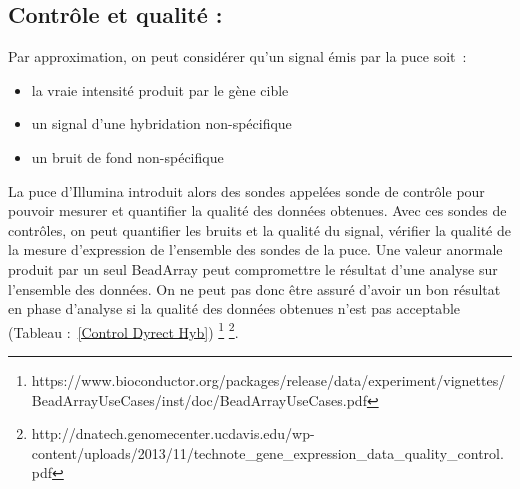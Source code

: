 \documentclass[a4paper,10pt]{article}
\begin{document}
\subsection{ Contrôle et qualité :}
Par approximation, on peut considérer qu’un signal émis par la puce soit :
\begin{itemize}
 \item la vraie intensité produit par le gène cible
 \item un signal d’une hybridation non-spécifique
 \item un bruit de fond non-spécifique
\end{itemize}
La puce d’Illumina introduit alors des sondes appelées sonde de contrôle pour pouvoir mesurer et quantifier la qualité des données obtenues.
Avec ces sondes de contrôles, on peut quantifier les bruits et la qualité du signal, vérifier la qualité de la mesure d’expression de l'ensemble des sondes de la puce. 
Une valeur anormale produit par un seul BeadArray peut compromettre le résultat d’une analyse sur l’ensemble des données. 
On ne peut pas donc être assuré d’avoir un bon résultat en phase d’analyse si la qualité des données obtenues n’est pas acceptable (Tableau :~\ref{Control Dyrect  Hyb})
\footnote{https://www.bioconductor.org/packages/release/data/experiment/vignettes/BeadArrayUseCases/inst/doc/BeadArrayUseCases.pdf}
\footnote{http://dnatech.genomecenter.ucdavis.edu/wp-content/uploads/2013/11/technote\_gene\_expression\_data\_quality\_control.pdf}.
\end{document}
